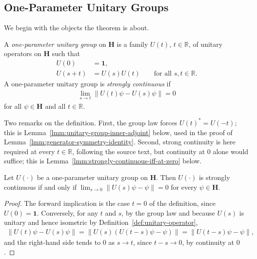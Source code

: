 \subsection{One-Parameter Unitary Groups}
We begin with the objects the theorem is about.

\begin{definition}
    \label{def:hall-10.11}
    \leanok
    A \textit{one-parameter unitary group} on $\mathbf{H}$ is a family $U(t)$, $t \in \mathbb{R}$, of unitary operators on $\mathbf{H}$ such that
    \begin{align}
        U(0) &= \mathbf{1}, \\
        U(s + t) &= U(s)U(t) \qquad \text{for all } s,t \in \mathbb{R}.
    \end{align}
    A one-parameter unitary group is \textit{strongly continuous} if
    \begin{align}
        \lim\limits_{s \rightarrow t} \left\| U(t)\psi - U(s)\psi \right\| = 0
    \end{align}
    for all $\psi \in \mathbf{H}$ and all $t \in \mathbb{R}$.

    Two remarks on the definition. First, the group law forces $U(t)^* = U(-t)$; this is Lemma~\ref{lmm:unitary-group-inner-adjoint} below, used in the proof of Lemma~\ref{lmm:generator-symmetry-identity}. Second, strong continuity is here required at every $t \in \mathbb{R}$, following the source text, but continuity at $0$ alone would suffice; this is Lemma~\ref{lmm:strongly-continuous-iff-at-zero} below.
\end{definition}

\begin{lemma}
    \label{lmm:strongly-continuous-iff-at-zero}
    \leanok
    Let $U(\cdot)$ be a one-parameter unitary group on $\mathbf{H}$. Then $U(\cdot)$ is strongly continuous if and only if $\lim_{s \to 0} \left\| U(s)\psi - \psi \right\| = 0$ for every $\psi \in \mathbf{H}$.
\end{lemma}
\begin{proof}
    \leanok
The forward implication is the case $t = 0$ of the definition, since $U(0) = \mathbf{1}$. Conversely, for any $t$ and $s$, by the group law and because $U(s)$ is unitary and hence isometric by Definition~\ref{def:unitary-operator},
\begin{align}
    \left\| U(t)\psi - U(s)\psi \right\| = \left\| U(s) \left( U(t-s)\psi - \psi \right) \right\| = \left\| U(t-s)\psi - \psi \right\|,
\end{align}
and the right-hand side tends to $0$ as $s \to t$, since $t - s \to 0$, by continuity at $0$.
\end{proof}

